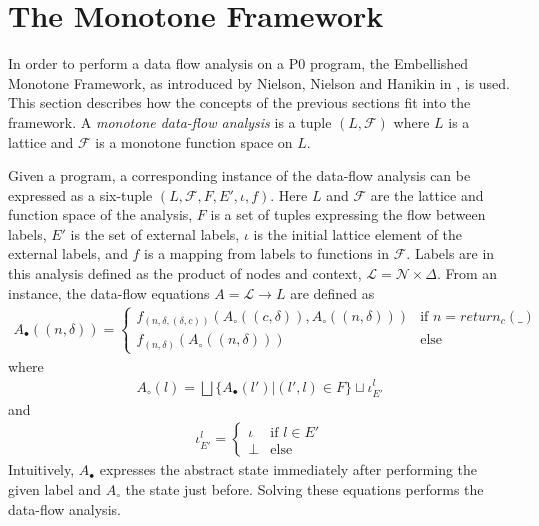\section{The Monotone Framework}
\label{sec:framework}
In order to perform a data flow analysis on a P0 program, the Embellished Monotone Framework, as introduced by Nielson, Nielson and Hanikin in , is used. This section describes how the concepts of the previous sections fit into the framework. A \emph{monotone data-flow analysis} is a tuple $(L, \mathcal{F})$ where $L$ is a lattice and $\mathcal{F}$ is a monotone function space on $L$.

Given a program, a corresponding instance of the data-flow analysis can be expressed as a six-tuple $(L, \mathcal{F}, F, E', \iota, f)$. Here $L$ and $\mathcal{F}$ are the lattice and function space of the analysis, $F$ is a set of tuples expressing the flow between labels, $E'$ is the set of external labels, $\iota$ is the initial lattice element of the external labels, and $f$ is a mapping from labels to functions in $\mathcal{F}$. Labels are in this analysis defined as the product of nodes and context, $\mathcal{L} = \mathcal{N}\times \Delta$. From an instance, the data-flow equations $A = \mathcal{L} \rightarrow L$ are defined as
\begin{align}
	A_\bullet ((n, \delta)) = \begin{cases} 
		f_{(n, \delta, (\delta, c))}(A_\circ(( c, \delta)), A_\circ((n, \delta))) &\text{if $n=\mathit{return}_c(\_)$}\\
		f_{(n, \delta)}(A_\circ((n, \delta)))& \text{else}
		\end{cases}
\end{align}
where 
\begin{align}
	A_\circ (l) = \bigsqcup \{A_\bullet(l') | (l', l) \in F\} \sqcup \iota_{E'}^l
\end{align}
and
\begin{align}
\iota_{E'}^l = \begin{cases} \iota & \text{if }l\in E' \\  \bot &\text{else} \end{cases}
\end{align}
Intuitively, $A_\bullet$ expresses the abstract state immediately after performing the given label and $A_\circ$ the state just before. Solving these equations performs the data-flow analysis. 


